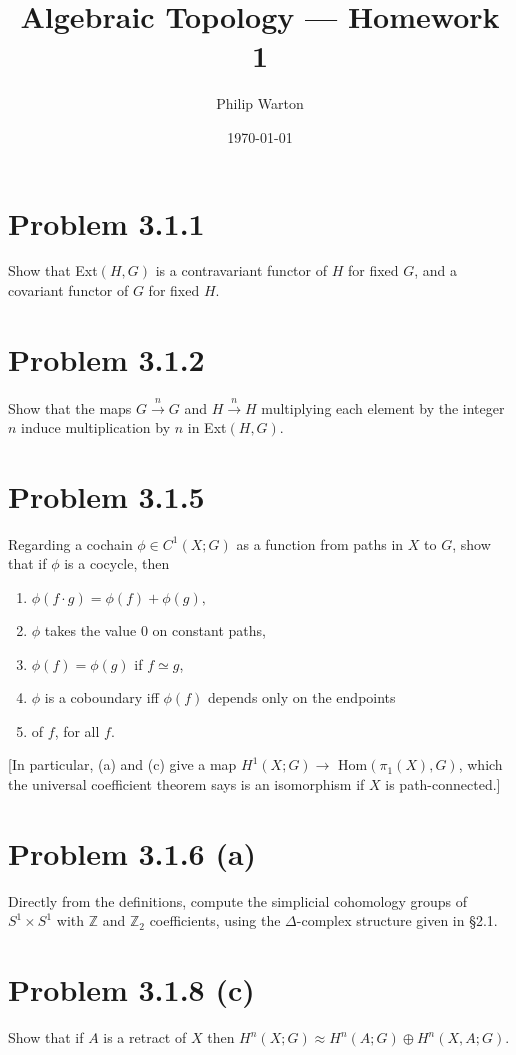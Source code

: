 \documentclass{article}
\theoremstyle{definition}
\begin{document}
\title{Algebraic Topology --- Homework 1}
\author{Philip Warton}
\date{\today}
\maketitle

\section*{Problem 3.1.1}
Show that Ext$(H,G)$ is a contravariant functor of $H$ for fixed $G$, 
and a covariant functor of $G$ for fixed $H$.

\section*{Problem 3.1.2}
Show that the maps $G \xrightarrow{n}G$ and $H\xrightarrow{n}H$ multiplying
each element by the integer $n$ induce multiplication by $n$ in Ext$(H,G)$.

\section*{Problem 3.1.5}
Regarding a cochain $\phi \in C^1(X;G)$ as a function from paths in $X$ to 
$G$, show that if $\phi$ is a cocycle, then 
\begin{enumerate}
    \item $\phi(f \cdot g) = \phi(f) + \phi(g),$
    \item $\phi$ takes the value 0 on constant paths,
    \item $\phi(f) = \phi(g)$ if $f \simeq g$,
    \item $\phi$ is a coboundary iff $\phi(f)$ depends only on the endpoints 
    \item of $f$, for all $f$. 
\end{enumerate}
[In particular, (a) and (c) give a map $H^1(X;G) \to$ Hom$(\pi_1(X),G)$,
which the universal coefficient theorem says is an isomorphism if $X$ 
is path-connected.]

\section*{Problem 3.1.6 (a)}
Directly from the definitions, compute the simplicial cohomology groups 
of $S^1 \times S^1$ with $\mathbb{Z}$ and $\mathbb{Z}_2$ coefficients,
using the $\Delta$-complex structure given in \S 2.1.

\section*{Problem 3.1.8 (c)}
Show that if $A$ is a retract of $X$ then $H^n(X;G) \approx H^n(A;G) \oplus H^n(X,A;G)$.
\end{document}
